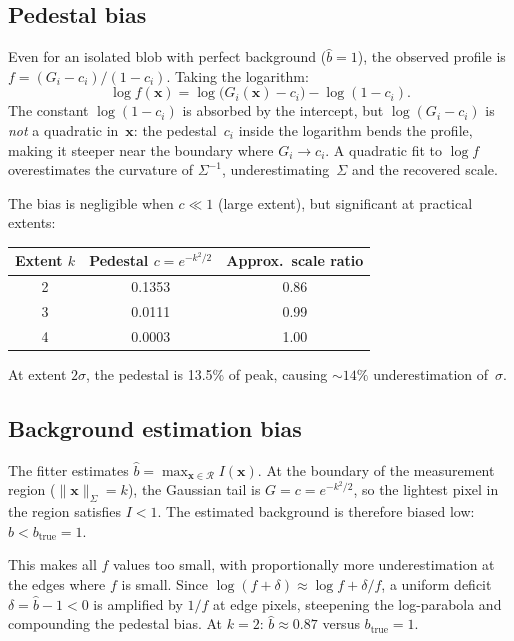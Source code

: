 \documentclass[11pt]{article}
\begin{document}
\subsection{Pedestal bias}

Even for an isolated blob with perfect background ($\hat{b} = 1$), the
observed profile is $f = (G_i - c_i)/(1 - c_i)$.  Taking the logarithm:
\begin{equation}
  \log f(\mathbf{x})
    = \log\!\bigl(G_i(\mathbf{x}) - c_i\bigr) - \log(1 - c_i).
  \label{eq:logf-exact}
\end{equation}
The constant $\log(1 - c_i)$ is absorbed by the intercept, but
$\log(G_i - c_i)$ is \emph{not} a quadratic in~$\mathbf{x}$: the
pedestal~$c_i$ inside the logarithm bends the profile, making it steeper
near the boundary where $G_i \to c_i$.  A quadratic fit to $\log f$
overestimates the curvature of $\Sigma^{-1}$, underestimating~$\Sigma$
and the recovered scale.

The bias is negligible when $c \ll 1$ (large extent), but significant at
practical extents:

\begin{center}
\begin{tabular}{@{}ccc@{}}
\toprule
Extent $k$ & Pedestal $c = e^{-k^2/2}$ & Approx.\ scale ratio \\
\midrule
2 & 0.1353 & 0.86 \\
3 & 0.0111 & 0.99 \\
4 & 0.0003 & 1.00 \\
\bottomrule
\end{tabular}
\end{center}

\noindent
At extent $2\sigma$, the pedestal is 13.5\% of peak, causing
$\sim\!14\%$ underestimation of~$\sigma$.

\subsection{Background estimation bias}

The fitter estimates $\hat{b} = \max_{\mathbf{x} \in \mathcal{R}}
I(\mathbf{x})$.  At the boundary of the measurement region
($\|\mathbf{x}\|_\Sigma = k$), the Gaussian tail is $G = c =
e^{-k^2/2}$, so the lightest pixel in the region satisfies
$I < 1$.  The estimated background is therefore biased low:
$\hat{b} < b_{\mathrm{true}} = 1$.

This makes all $f$ values too small, with proportionally more
underestimation at the edges where $f$ is small.  Since $\log(f +
\delta) \approx \log f + \delta / f$, a uniform deficit~$\delta =
\hat{b} - 1 < 0$ is amplified by $1/f$ at edge pixels, steepening the
log-parabola and compounding the pedestal bias.  At $k = 2$:
$\hat{b} \approx 0.87$ versus $b_{\mathrm{true}} = 1$.
\end{document}
